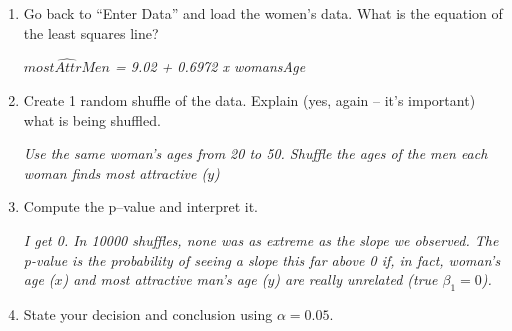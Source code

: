 \begin{enumerate}
\begin{enumerate}
  $H_a$
\begin{students}
 \vspace{1cm}      
\end{students}
\begin{key}
  {\it  $\beta_1 > 0$   We don't expect a negative relationship.}
\end{key}

  \item Go back to ``Enter Data'' and load the women's data.  What is
    the equation of the least squares line?
\begin{students}
 \vspace{1cm}      
\end{students}

\begin{key}
  {\it $\widehat{mostAttrMen}$ = 9.02 + 0.6972 x womansAge}
\end{key}


  \item Create 1 random shuffle of the data.  Explain (yes, again --
    it's important)  what is being shuffled. 
\begin{students}
 \vspace{1.8cm}      
\end{students}

\begin{key}
  {\it Use the same woman's ages from 20 to 50. Shuffle the ages of the
    men each woman finds most attractive ($y$)}
\end{key}

  \item Compute the p--value and interpret it.
\begin{students}
 \vspace{1cm}      
\end{students}

\begin{key}
  {\it I get 0. In 10000 shuffles, none was as extreme as the slope we
    observed. The p-value is the probability of seeing a slope this
    far above 0 if, in fact, woman's age ($x$) and most attractive
    man's age ($y$) are really unrelated (true $\beta_1=0$).}
\end{key}


\item State your decision and conclusion using $\alpha = 0.05$.
\begin{students}
 \vspace{2cm}      
\end{students}


\end{enumerate}
\end{enumerate}
